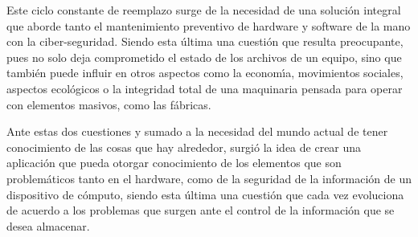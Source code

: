 Este ciclo constante de reemplazo surge de la necesidad de una soluci\'on integral
que aborde tanto el mantenimiento preventivo de hardware y software de la mano
con la ciber-seguridad. Siendo esta \'ultima una cuesti\'on que resulta preocupante,
pues no solo deja comprometido el estado de los archivos de un equipo, sino que
tambi\'en puede influir en otros aspectos como la econom\'{\i}a, movimientos sociales,
aspectos ecol\'ogicos o la integridad total de una maquinaria pensada para operar
con elementos masivos, como las f\'abricas.

Ante estas dos cuestiones y sumado a la necesidad del mundo actual de tener
conocimiento de las cosas que hay alrededor, surgi\'o la idea de crear una
aplicaci\'on que pueda otorgar conocimiento de los elementos que son problem\'aticos
tanto en el hardware, como de la seguridad de la informaci\'on de un dispositivo
de c\'omputo, siendo esta \'ultima una cuesti\'on que cada vez evoluciona de acuerdo a
los problemas que surgen ante el control de la informaci\'on que se desea
almacenar.
